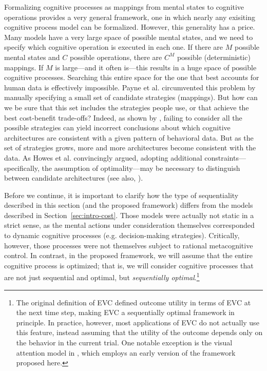 Formalizing cognitive processes as mappings from mental states to cognitive operations provides a very general framework, one in which nearly any exisiting cognitive process model can be formalized. However, this generality has a price. Many models have a very large space of possible mental states, and we need to specify which cognitive operation is executed in each one. If there are $M$ possible mental states and $C$ possible operations, there are $C^M$ possible (deterministic) mappings. If $M$ is large---and it often is---this results in a huge space of possible cognitive processes. Searching this entire space for the one that best accounts for human data is effectively impossible. Payne et al. circumvented this problem by manually specifying a small set of candidate strategies (mappings). But how can we be sure that this set includes the strategies people use, or that achieve the best cost-benefit trade-offs? Indeed, as shown by \citet{howes2009rational}, failing to consider all the possible strategies can yield incorrect conclusions about which cognitive architectures are consistent with a given pattern of behavioral data. But as the set of strategies grows, more and more architectures become consistent with the data. As Howes et al. convincingly argued, adopting additional constraints---specifically, the assumption of optimality---may be necessary to distinguish between candidate architectures (see also, \citealp{lewis2014computational}).

Before we continue, it is important to clarify how the type of sequentiality described in this section (and the proposed framework) differs from the models described in Section~\ref{sec:intro-cost}. Those models were actually not static in a strict sense, as the mental actions under consideration themselves corresponded to dynamic cognitive processes (e.g. decision-making strategies). Critically, however, those processes were not themselves subject to rational metacognitive control. In contrast, in the proposed framework, we will assume that the entire cognitive process is optimized; that is, we will consider cognitive processes that are not just sequential and optimal, but \emph{sequentially optimal}.\footnote{%
  The original definition of EVC \citep{shenhav2013expected} defined outcome utility in terms of EVC at the next time step, making EVC a sequentially optimal framework in principle. In practice, however, most applications of EVC do not actually use this feature, instead assuming that the utility of the outcome depends only on the behavior in the current trial. One notable exception is the visual attention model in \citet{lieder2018rational}, which employs an early version of the framework proposed here.
}




